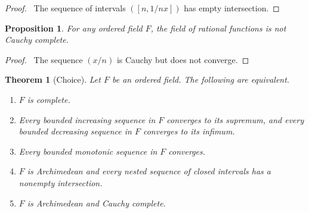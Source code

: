 \documentclass{article}
\let\qed\relax
\newtheorem{proposition}[axiom]{Proposition}
\newtheorem{theorem}[axiom]{Theorem}
\theoremstyle{definition}
\begin{document}
    \begin{proof}
        \pf\ The sequence of intervals $([n, 1/nx])$ has empty intersection. \qed
    \end{proof}

    \begin{proposition}
        For any ordered field $F$, the field of rational functions is not Cauchy complete.
    \end{proposition}

    \begin{proof}
        \pf\ The sequence $(x/n)$ is Cauchy but does not converge. \qed
    \end{proof}

    \begin{theorem}[Choice]
        \label{theorem:complete_ordered_field}
        Let $F$ be an ordered field. The following are equivalent.
        \begin{enumerate}
            \item $F$ is complete.
            \item Every bounded increasing sequence in $F$ converges to its supremum, and every bounded decreasing sequence in $F$
            converges to its infimum.
            \item Every bounded monotonic sequence in $F$ converges.
            \item $F$ is Archimedean and every nested sequence of closed intervals has a nonempty intersection.
            \item $F$ is Archimedean and Cauchy complete.
        \end{enumerate}
    \end{theorem}
\end{document}
